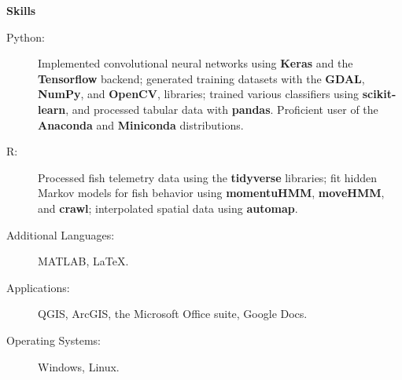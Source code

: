 \documentclass[letterpaper,11pt]{article}
\newcommand{\resheading}[1]{{\large \colorbox{mygrey}{\begin{minipage}{\textwidth}{\textbf{#1 \vphantom{p\^{E}}}}\end{minipage}}}}
\begin{document}
\resheading{Skills}
	\begin{description}
		\item[Python:] { \footnotesize Implemented convolutional neural networks using \textbf{Keras} and  the \textbf{Tensorflow} backend; generated training datasets with the \textbf{GDAL}, \textbf{NumPy}, and \textbf{OpenCV}, libraries; trained various classifiers using \textbf{scikit-learn}, and processed tabular data with \textbf{pandas}. Proficient user of the \textbf{Anaconda} and \textbf{Miniconda} distributions.}\\
		
		\item[R:] { \footnotesize Processed fish telemetry data using the \textbf{tidyverse} libraries; fit hidden Markov models for fish behavior using \textbf{momentuHMM}, \textbf{moveHMM}, and \textbf{crawl}; interpolated spatial data using \textbf{automap}.}
		
		\item[Additional Languages:] {\footnotesize MATLAB, \LaTeX.}
		
		\item[Applications:]{\footnotesize QGIS, ArcGIS, the Microsoft Office suite, Google Docs.}
		
		\item[Operating Systems:] {\footnotesize Windows, Linux}.
	\end{description}
\end{document}
